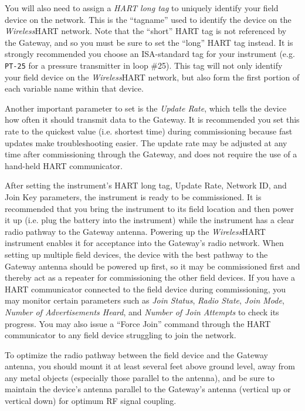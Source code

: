 \vskip 10pt

\filbreak

You will also need to assign a {\it HART long tag} to uniquely identify your field device on the network.  This is the ``tagname'' used to identify the device on the {\sl Wireless}HART network.  Note that the ``short'' HART tag is not referenced by the Gateway, and so you must be sure to set the ``long'' HART tag instead.  It is strongly recommended you choose an ISA-standard tag for your instrument (e.g. {\tt PT-25} for a pressure transmitter in loop \#25).  This tag will not only identify your field device on the {\sl Wireless}HART network, but also form the first portion of each variable name within that device.

Another important parameter to set is the {\it Update Rate}, which tells the device how often it should transmit data to the Gateway.  It is recommended you set this rate to the quickest value (i.e. shortest time) during commissioning because fast updates make troubleshooting easier.  The update rate may be adjusted at any time after commissioning through the Gateway, and does not require the use of a hand-held HART communicator.

\vskip 10pt

After setting the instrument's HART long tag, Update Rate, Network ID, and Join Key parameters, the instrument is ready to be commissioned.  It is recommended that you bring the instrument to its field location and then power it up (i.e. plug the battery into the instrument) while the instrument has a clear radio pathway to the Gateway antenna.  Powering up the {\sl Wireless}HART instrument enables it for acceptance into the Gateway's radio network.  When setting up multiple field devices, the device with the best pathway to the Gateway antenna should be powered up first, so it may be commissioned first and thereby act as a repeater for commissioning the other field devices.  If you have a HART communicator connected to the field device during commissioning, you may monitor certain parameters such as {\it Join Status}, {\it Radio State}, {\it Join Mode}, {\it Number of Advertisements Heard}, and {\it Number of Join Attempts} to check its progress.  You may also issue a ``Force Join'' command through the HART communicator to any field device struggling to join the network.

To optimize the radio pathway between the field device and the Gateway antenna, you should mount it at least several feet above ground level, away from any metal objects (especially those parallel to the antenna), and be sure to maintain the device's antenna parallel to the Gateway's antenna (vertical up or vertical down) for optimum RF signal coupling.

